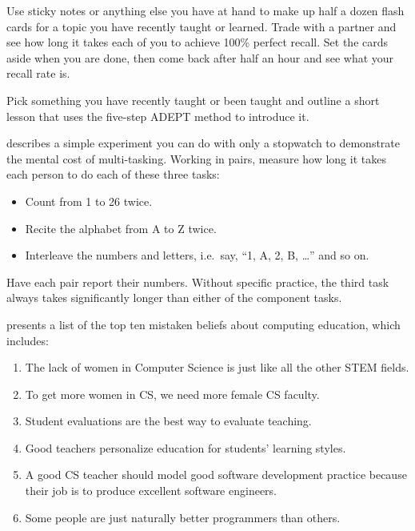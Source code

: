 Use sticky notes or anything else you have at hand
to make up half a dozen flash cards
for a topic you have recently taught or learned.
Trade with a partner and see how long it takes each of you
to achieve 100\% perfect recall.
Set the cards aside when you are done,
then come back after half an hour and see what your recall rate is.


Pick something you have recently taught or been taught
and outline a short lesson that uses the five-step ADEPT method to introduce it.


describes a simple experiment you can do with only a stopwatch
to demonstrate the mental cost of multi-tasking.
Working in pairs,
measure how long it takes each person to do each of these three tasks:

\begin{itemize}
\item
  Count from 1 to 26 twice.
\item
  Recite the alphabet from A to Z twice.
\item
  Interleave the numbers and letters,
  i.e.\ say, ``1, A, 2, B, {\ldots}''
  and so on.
\end{itemize}

Have each pair report their numbers.
Without specific practice,
the third task always takes significantly longer than either of the component tasks.


\cite{Guzd2015b} presents a list of the top ten mistaken beliefs about computing education,
which includes:

\begin{enumerate}
\item
  The lack of women in Computer Science is just like all the other STEM fields.
\item
  To get more women in CS, we need more female CS faculty.
\item
  Student evaluations are the best way to evaluate teaching.
\item
  Good teachers personalize education for students' learning styles.
\item
  A good CS teacher should model good software development practice
  because their job is to produce excellent software engineers.
\item
  Some people are just naturally better programmers than others.
\end{enumerate}

